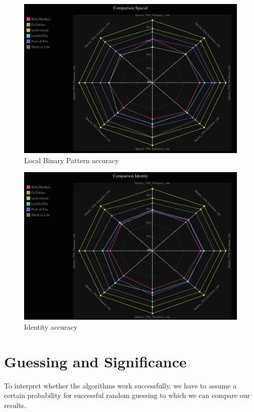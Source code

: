 \documentclass{report}
\begin{document}
\begin{figure}[!htb]
  \centering
  \includegraphics[scale=0.2]{images/Spacial_radar.png}
  \caption{Local Binary Pattern accuracy}
  \label{fig:spa-acc}
\end{figure}

\begin{figure}[!htb]
  \centering
  \includegraphics[scale=0.2]{images/Identity_radar.png}
  \caption{Identity accuracy}
  \label{fig:ide-acc}
\end{figure}

\section{Guessing and Significance}
To interpret whether the algorithms work successfully, we have to assume a certain probability for successful random guessing to which we can compare our results.
\end{document}
